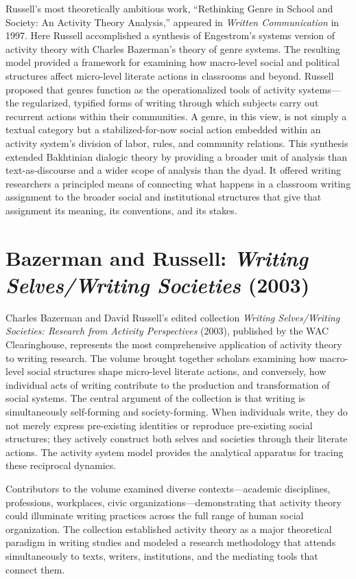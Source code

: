 \documentclass[12pt]{article}
\begin{document}
Russell's most theoretically ambitious work, ``Rethinking Genre in School and Society: An Activity Theory Analysis,'' appeared in \textit{Written Communication} in 1997. Here Russell accomplished a synthesis of Engestrom's systems version of activity theory with Charles Bazerman's theory of genre systems. The resulting model provided a framework for examining how macro-level social and political structures affect micro-level literate actions in classrooms and beyond. Russell proposed that genres function as the operationalized tools of activity systems---the regularized, typified forms of writing through which subjects carry out recurrent actions within their communities. A genre, in this view, is not simply a textual category but a stabilized-for-now social action embedded within an activity system's division of labor, rules, and community relations. This synthesis extended Bakhtinian dialogic theory by providing a broader unit of analysis than text-as-discourse and a wider scope of analysis than the dyad. It offered writing researchers a principled means of connecting what happens in a classroom writing assignment to the broader social and institutional structures that give that assignment its meaning, its conventions, and its stakes.

\section{Bazerman and Russell: \textit{Writing Selves/Writing Societies} (2003)}

Charles Bazerman and David Russell's edited collection \textit{Writing Selves/Writing Societies: Research from Activity Perspectives} (2003), published by the WAC Clearinghouse, represents the most comprehensive application of activity theory to writing research. The volume brought together scholars examining how macro-level social structures shape micro-level literate actions, and conversely, how individual acts of writing contribute to the production and transformation of social systems. The central argument of the collection is that writing is simultaneously self-forming and society-forming. When individuals write, they do not merely express pre-existing identities or reproduce pre-existing social structures; they actively construct both selves and societies through their literate actions. The activity system model provides the analytical apparatus for tracing these reciprocal dynamics.

Contributors to the volume examined diverse contexts---academic disciplines, professions, workplaces, civic organizations---demonstrating that activity theory could illuminate writing practices across the full range of human social organization. The collection established activity theory as a major theoretical paradigm in writing studies and modeled a research methodology that attends simultaneously to texts, writers, institutions, and the mediating tools that connect them.
\end{document}
